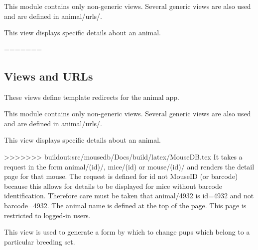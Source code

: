 \documentclass[letterpaper,10pt,english]{sphinxmanual}
\begin{document}
This module contains only non-generic views.  Several generic views are also used and are defined in animal/urls/.

\begin{fulllineitems}
\label{api:animal.views.animal_detail}
This view displays specific details about an animal.

=======


\subsection{Views and URLs}
\label{api:id3}\label{api:module-animal.views}
These views define template redirects for the animal app.

This module contains only non-generic views.  Several generic views are also used and are defined in animal/urls/.

\begin{fulllineitems}
\label{api:animal.views.animal_detail}
This view displays specific details about an animal.

>>>>>>> buildout:src/mousedb/Docs/build/latex/MouseDB.tex
It takes a request in the form animal/(id)/, mice/(id) or mouse/(id)/ and renders the detail page for that mouse.  The request is defined for id not MouseID (or barcode) because this allows for details to be displayed for mice without barcode identification.
Therefore care must be taken that animal/4932 is id=4932 and not barcode=4932.  The animal name is defined at the top of the page.
This page is restricted to logged-in users.

\end{fulllineitems}


\begin{fulllineitems}
\label{api:animal.views.breeding_change}
This view is used to generate a form by which to change pups which belong to a particular breeding set.


\end{fulllineitems}
\end{fulllineitems}
\end{document}
